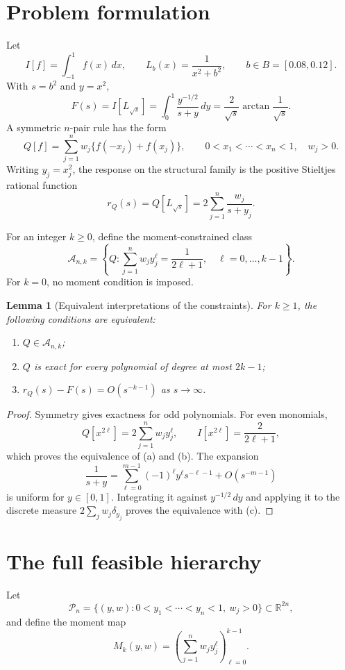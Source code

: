 \documentclass[preprint,12pt]{elsarticle}
\newtheorem{lemma}[theorem]{Lemma}
\theoremstyle{remark}
\begin{document}
\section{Problem formulation}

Let
\[
I[f]=\int_{-1}^{1} f(x)\,dx,
\qquad
L_b(x)=\frac{1}{x^2+b^2},
\qquad
b\in B=[0.08,0.12].
\]
With \(s=b^2\) and \(y=x^2\),
\[
F(s)=I[L_{\sqrt{s}}]
=\int_0^1\frac{y^{-1/2}}{s+y}\,dy
=\frac{2}{\sqrt{s}}\arctan\frac{1}{\sqrt{s}}.
\]
A symmetric \(n\)-pair rule has the form
\[
Q[f]=\sum_{j=1}^{n}w_j\{f(-x_j)+f(x_j)\},
\qquad
0<x_1<\cdots<x_n<1,\quad w_j>0.
\]
Writing \(y_j=x_j^2\), the response on the structural family is the
positive Stieltjes rational function
\[
r_Q(s)=Q[L_{\sqrt{s}}]
=2\sum_{j=1}^{n}\frac{w_j}{s+y_j}.
\]

For an integer \(k\geq0\), define the moment-constrained class
\[
\mathcal A_{n,k}
=
\left\{
Q:
\sum_{j=1}^{n}w_jy_j^\ell=\frac{1}{2\ell+1},
\quad \ell=0,\ldots,k-1
\right\}.
\]
For \(k=0\), no moment condition is imposed.

\begin{lemma}[Equivalent interpretations of the constraints]
For \(k\geq1\), the following conditions are equivalent:
\begin{enumerate}[label=(\alph*)]
\item \(Q\in\mathcal A_{n,k}\);
\item \(Q\) is exact for every polynomial of degree at most \(2k-1\);
\item \(r_Q(s)-F(s)=O(s^{-k-1})\) as \(s\to\infty\).
\end{enumerate}
\end{lemma}

\begin{proof}
Symmetry gives exactness for odd polynomials. For even monomials,
\[
Q[x^{2\ell}]=2\sum_{j=1}^{n}w_jy_j^\ell,
\qquad
I[x^{2\ell}]=\frac{2}{2\ell+1},
\]
which proves the equivalence of (a) and (b). The expansion
\[
\frac{1}{s+y}
=
\sum_{\ell=0}^{m-1}(-1)^\ell y^\ell s^{-\ell-1}
+O(s^{-m-1})
\]
is uniform for \(y\in[0,1]\). Integrating it against
\(y^{-1/2}\,dy\) and applying it to the discrete measure
\(2\sum_jw_j\delta_{y_j}\) proves the equivalence with (c).
\end{proof}

\section{The full feasible hierarchy}

Let
\[
\mathcal P_n
=
\{(y,w):
0<y_1<\cdots<y_n<1,\ w_j>0\}
\subset\mathbb R^{2n},
\]
and define the moment map
\[
M_k(y,w)
=
\left(
\sum_{j=1}^{n}w_jy_j^\ell
\right)_{\ell=0}^{k-1}.
\]
\end{document}
